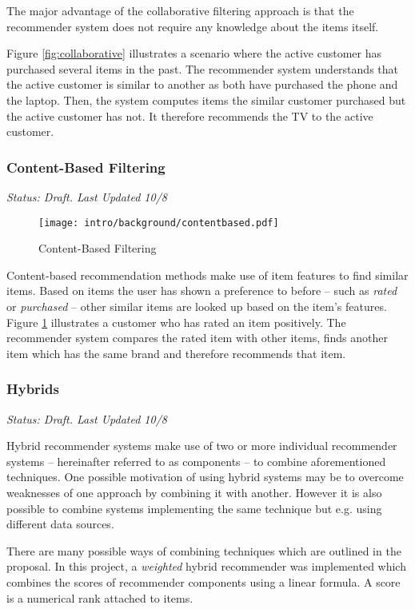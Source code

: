 The major advantage of the collaborative filtering approach is that the recommender system does not require any knowledge about the items itself.

Figure \ref{fig:collaborative} illustrates a scenario where the active customer has purchased several items in the past. The recommender system understands that the active customer is similar to another as both have purchased the phone and the laptop. Then, the system computes items the similar customer purchased but the active customer has not. It therefore recommends the TV to the active customer.

\subsubsection{Content-Based Filtering}

\emph{Status: Draft. Last Updated 10/8}

\begin{figure}[ht]
    \texttt{[image: intro/background/contentbased.pdf]}
    \caption{Content-Based Filtering}
    \label{fig:contentbased}
\end{figure}

Content-based recommendation methods make use of item features to find similar items. Based on items the user has shown a preference to before -- such as \emph{rated} or \emph{purchased} -- other similar items are looked up based on the item's features. Figure \ref{fig:contentbased} illustrates a customer who has rated an item positively. The recommender system compares the rated item with other items, finds another item which has the same brand and therefore recommends that item.

\subsubsection{Hybrids}
\label{intro-bg-tech-hybrid}

\emph{Status: Draft. Last Updated 10/8}

Hybrid recommender systems make use of two or more individual recommender systems -- hereinafter referred to as components -- to combine aforementioned techniques. One possible motivation of using hybrid systems may be to overcome weaknesses of one approach by combining it with another. However it is also possible to combine systems implementing the same technique but e.g. using different data sources.

There are many possible ways of combining techniques which are outlined in the proposal. In this project, a \emph{weighted} hybrid recommender was implemented which combines the scores of recommender components using a linear formula. A score is a numerical rank attached to items.

